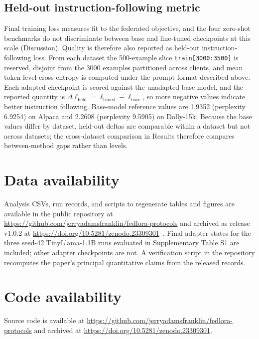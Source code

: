 \documentclass[pdflatex,sn-nature,lineno]{sn-jnl}
\begin{document}
\subsection{Held-out instruction-following metric}
\label{sec:heldout}
Final training loss measures fit to the federated objective, and the four zero-shot benchmarks do not discriminate between base and fine-tuned checkpoints at this scale (Discussion). Quality is therefore also reported as held-out instruction-following loss. From each dataset the 500-example slice \texttt{train[3000:3500]} is reserved, disjoint from the 3000 examples partitioned across clients, and mean token-level cross-entropy is computed under the prompt format described above. Each adapted checkpoint is scored against the unadapted base model, and the reported quantity is $\Delta\ell_{\mathrm{held}} = \ell_{\mathrm{tuned}} - \ell_{\mathrm{base}}$, so more negative values indicate better instruction following. Base-model reference values are 1.9352 (perplexity 6.9254) on Alpaca and 2.2608 (perplexity 9.5905) on Dolly-15k. Because the base values differ by dataset, held-out deltas are comparable within a dataset but not across datasets; the cross-dataset comparison in Results therefore compares between-method gaps rather than levels.

\backmatter

\section*{Data availability}
Analysis CSVs, run records, and scripts to regenerate tables and figures are available in the public repository at \url{https://github.com/jerryadamsfranklin/fedlora-protocols} and archived as release v1.0.2 at \url{https://doi.org/10.5281/zenodo.23309301}~\cite{franklin2026fedloraprotocols}. Final adapter states for the three seed-42 TinyLlama-1.1B runs evaluated in Supplementary Table S1 are included; other adapter checkpoints are not. A verification script in the repository recomputes the paper's principal quantitative claims from the released records.

\section*{Code availability}
Source code is available at \url{https://github.com/jerryadamsfranklin/fedlora-protocols} and archived at \url{https://doi.org/10.5281/zenodo.23309301}.


\end{document}
